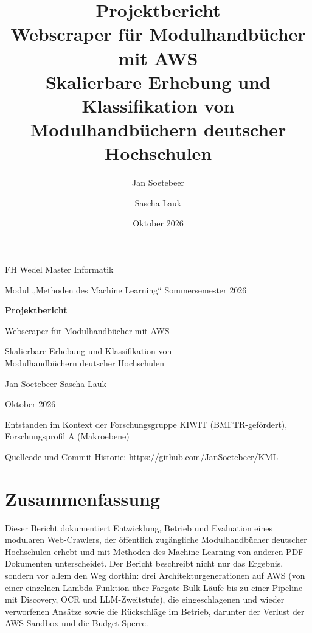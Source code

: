 \documentclass[a4paper,11pt,headings=small,parskip=half-,numbers=noenddot,bibliography=totoc]{scrreprt}
\title{Projektbericht\\[0.4em]\Large Webscraper für Modulhandbücher mit AWS\\[0.2em]\large Skalierbare Erhebung und Klassifikation von Modulhandbüchern deutscher Hochschulen}
\author{Jan Soetebeer \and Sascha Lauk}
\date{Oktober 2026}
\renewcommand{\_}{\textunderscore\allowbreak{}}
\begin{document}
\begin{titlepage}
  \centering
  \vspace*{1.5cm}
  {\large FH Wedel \textperiodcentered{} Master Informatik\par}
  {\normalsize Modul „Methoden des Machine Learning“ \textperiodcentered{} Sommersemester 2026\par}
  \vspace{2.2cm}
  {\Huge\bfseries Projektbericht\par}
  \vspace{0.8cm}
  {\LARGE Webscraper für Modulhandbücher mit AWS\par}
  \vspace{0.5cm}
  {\large Skalierbare Erhebung und Klassifikation von\\Modulhandbüchern deutscher Hochschulen\par}
  \vspace{2.5cm}
  {\large Jan Soetebeer \quad\textperiodcentered\quad Sascha Lauk\par}
  \vspace{1.2cm}
  {\normalsize Oktober 2026\par}
  \vfill
  {\small Entstanden im Kontext der Forschungsgruppe KIWIT (BMFTR-gefördert), Forschungsprofil A (Makroebene)\par}
  \vspace{0.3cm}
  {\footnotesize Quellcode und Commit-Historie: \url{https://github.com/JanSoetebeer/KML}\par}
\end{titlepage}


\chapter*{Zusammenfassung}
Dieser Bericht dokumentiert Entwicklung, Betrieb und Evaluation eines modularen Web-Crawlers, der öffentlich zugängliche Modulhandbücher deutscher Hochschulen erhebt und mit Methoden des Machine Learning von anderen PDF-Dokumenten unterscheidet. Der Bericht beschreibt nicht nur das Ergebnis, sondern vor allem den Weg dorthin: drei Architekturgenerationen auf AWS (von einer einzelnen Lambda-Funktion über Fargate-Bulk-Läufe bis zu einer Pipeline mit Discovery, OCR und LLM-Zweitstufe), die eingeschlagenen und wieder verworfenen Ansätze sowie die Rückschläge im Betrieb, darunter der Verlust der AWS-Sandbox und die Budget-Sperre.
\end{document}
